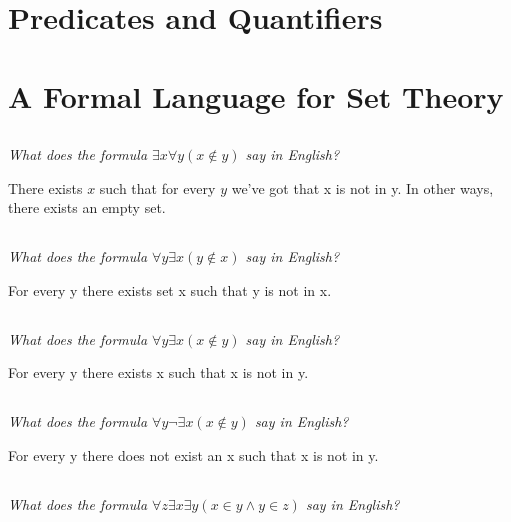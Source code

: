 \documentclass[11pt,oneside,titlepage]{book}
\begin{document}
\section{Predicates and Quantifiers}

\section{A Formal Language for Set Theory}

\subsection{}

\textit{What does the formula $\exists x \forall y (x \notin y)$ say in English? }

There exists $x$ such that for every $y$ we've got that x is not in y. In other ways, there
exists an empty set.

\subsection{}

\textit{What does the formula $\forall y \exists x (y \notin x)$ say in English?}

For every y there exists set x such that y is not in x.

\subsection{}

\textit{What does the formula $\forall y \exists x (x \notin y)$ say in English?}

For every y there exists x such that x is not in y.

\subsection{}

\textit{What does the formula $\forall y \neg \exists x (x \notin y)$ say in English?}

For every y there does not exist an x such that x is not in y.

\subsection{}

\textit{What does the formula $\forall z \exists x \exists y (x \in y \land y \in z)$
  say in English?}
\end{document}
